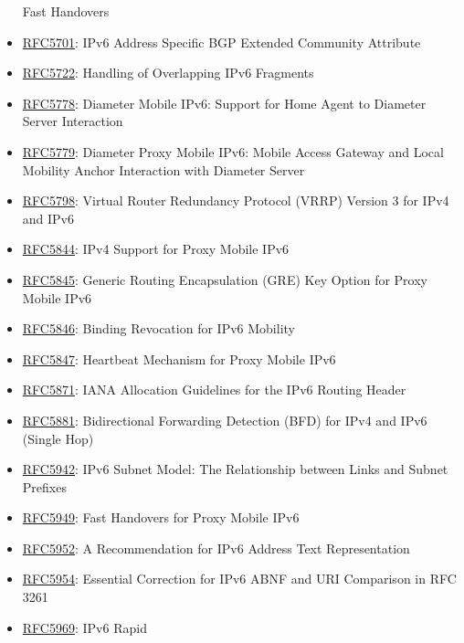 \documentclass[
]{article}
\begin{document}
\begin{itemize}
  Fast Handovers
\item
  \href{https://www.rfc-editor.org/info/rfc5701}{RFC5701}: IPv6 Address
  Specific BGP Extended Community Attribute
\item
  \href{https://www.rfc-editor.org/info/rfc5722}{RFC5722}: Handling of
  Overlapping IPv6 Fragments
\item
  \href{https://www.rfc-editor.org/info/rfc5778}{RFC5778}: Diameter
  Mobile IPv6: Support for Home Agent to Diameter Server Interaction
\item
  \href{https://www.rfc-editor.org/info/rfc5779}{RFC5779}: Diameter
  Proxy Mobile IPv6: Mobile Access Gateway and Local Mobility Anchor
  Interaction with Diameter Server
\item
  \href{https://www.rfc-editor.org/info/rfc5798}{RFC5798}: Virtual
  Router Redundancy Protocol (VRRP) Version 3 for IPv4 and IPv6
\item
  \href{https://www.rfc-editor.org/info/rfc5844}{RFC5844}: IPv4 Support
  for Proxy Mobile IPv6
\item
  \href{https://www.rfc-editor.org/info/rfc5845}{RFC5845}: Generic
  Routing Encapsulation (GRE) Key Option for Proxy Mobile IPv6
\item
  \href{https://www.rfc-editor.org/info/rfc5846}{RFC5846}: Binding
  Revocation for IPv6 Mobility
\item
  \href{https://www.rfc-editor.org/info/rfc5847}{RFC5847}: Heartbeat
  Mechanism for Proxy Mobile IPv6
\item
  \href{https://www.rfc-editor.org/info/rfc5871}{RFC5871}: IANA
  Allocation Guidelines for the IPv6 Routing Header
\item
  \href{https://www.rfc-editor.org/info/rfc5881}{RFC5881}: Bidirectional
  Forwarding Detection (BFD) for IPv4 and IPv6 (Single Hop)
\item
  \href{https://www.rfc-editor.org/info/rfc5942}{RFC5942}: IPv6 Subnet
  Model: The Relationship between Links and Subnet Prefixes
\item
  \href{https://www.rfc-editor.org/info/rfc5949}{RFC5949}: Fast
  Handovers for Proxy Mobile IPv6
\item
  \href{https://www.rfc-editor.org/info/rfc5952}{RFC5952}: A
  Recommendation for IPv6 Address Text Representation
\item
  \href{https://www.rfc-editor.org/info/rfc5954}{RFC5954}: Essential
  Correction for IPv6 ABNF and URI Comparison in RFC 3261
\item
  \href{https://www.rfc-editor.org/info/rfc5969}{RFC5969}: IPv6 Rapid

\end{itemize}
\end{document}

